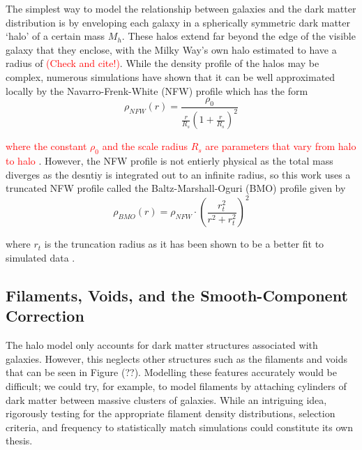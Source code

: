 \documentclass[%
 reprint,
 amsmath,amssymb,
 aps,nofootinbib
]{revtex4-1}
\begin{document}
The simplest way to model the relationship between galaxies and the dark matter distribution is by enveloping each galaxy in a spherically symmetric dark matter `halo' of a certain mass $M_h$. These halos extend far beyond the edge of the visible galaxy that they enclose, with the Milky Way's own halo estimated to have a radius of \textcolor{red}{(Check and cite!)}. While the density profile of the halos may be complex, numerous simulations have shown that it can be well approximated locally by the Navarro-Frenk-White (NFW) profile which has the form
\begin{equation}\label{nfw_profile}
\rho_{NFW}(r)=\frac{\rho_0}{\frac{r}{R_s}\left(1+\frac{r}{R_s}\right)^2}
\end{equation}

\noindent \textcolor{red}{where the constant $\rho_0$ and the scale radius $R_s$ are parameters that vary from halo to halo} \cite{nfw}. However, the NFW profile is not entierly physical as the total mass diverges as the desntiy is integrated out to an infinite radius, so this work uses a truncated NFW profile called the Baltz-Marshall-Oguri (BMO) profile given by
\begin{equation}\label{bmo_profile}
\rho_{BMO}(r)=\rho_{NFW}\cdot\left(\frac{r_t^2}{r^2+r_t^2}\right)^2
\end{equation}

\noindent where $r_t$ is the truncation radius as it has been shown to be a better fit to simulated data \cite{nfw_bmo}.


\subsection{Filaments, Voids, and the Smooth-Component Correction}

The halo model only accounts for dark matter structures associated with galaxies. However, this neglects other structures such as the filaments and voids that can be seen in Figure (??). Modelling these features accurately would be difficult; we could try, for example, to model filaments by attaching cylinders of dark matter between massive clusters of galaxies. While an intriguing idea, rigorously testing for the appropriate filament density distributions, selection criteria, and frequency to statistically match simulations could constitute its own thesis.

\end{document}

